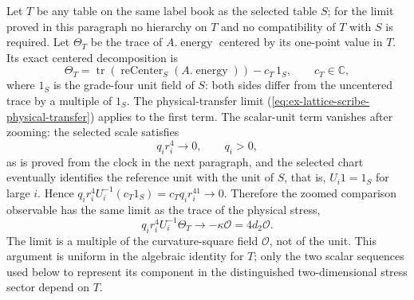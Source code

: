 Let $T$ be any table on the same label book as the selected table $S$;
for the limit proved in this paragraph no hierarchy on $T$ and no
compatibility of $T$ with $S$ is required. Let
$\Theta_T$ be the trace of $A.\operatorname{energy}$ centered by its
one-point value in $T$. Its exact
centered decomposition is
\[
 \Theta_T=\operatorname{tr}(\operatorname{reCenter}_S(A.\operatorname{energy}))-c_T\,1_S,
 \qquad c_T\in\mathbb C,
\]
where $1_S$ is the grade-four unit field of $S$: both sides differ from
the uncentered trace by a multiple of $1_S$.
The physical-transfer limit (\ref{eq:ex-lattice-scribe-physical-transfer})
applies to the first term. The scalar-unit term vanishes after zooming:
the selected scale satisfies
\begin{equation}
 q_i r_i^4\longrightarrow0,
 \qquad q_i>0,
 \label{eq:ex-lattice-scribe-band-cost}
\end{equation}
as is proved from the clock in the next paragraph, and the selected chart
eventually identifies the reference unit with the unit of $S$, that is,
$U_i1=1_S$ for large $i$. Hence
$q_ir_i^4U_i^{-1}(c_T1_S)=c_Tq_ir_i^41\to0$. Therefore the zoomed
comparison observable has the same limit as the trace of the physical
stress,
\[
 q_ir_i^4U_i^{-1}\Theta_T\longrightarrow-\kappa\mathcal O=4d_2\mathcal O.
\]
The limit is a multiple of the curvature-square field $\mathcal O$, not of
the unit. This argument is
uniform in the algebraic identity for $T$; only the two scalar sequences
used below to represent its component in the distinguished two-dimensional
stress sector depend on $T$.

